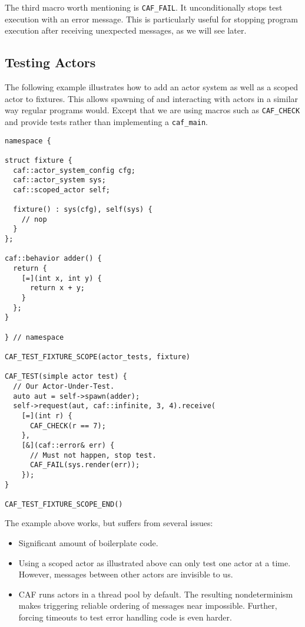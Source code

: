 The third macro worth mentioning is \lstinline^CAF_FAIL^. It unconditionally
stops test execution with an error message. This is particularly useful for
stopping program execution after receiving unexpected messages, as we will see
later.

\subsection{Testing Actors}

The following example illustrates how to add an actor system as well as a
scoped actor to fixtures. This allows spawning of and interacting with actors
in a similar way regular programs would. Except that we are using macros such
as \lstinline^CAF_CHECK^ and provide tests rather than implementing a
\lstinline^caf_main^.

\begin{lstlisting}
namespace {

struct fixture {
  caf::actor_system_config cfg;
  caf::actor_system sys;
  caf::scoped_actor self;

  fixture() : sys(cfg), self(sys) {
    // nop
  }
};

caf::behavior adder() {
  return {
    [=](int x, int y) {
      return x + y;
    }
  };
}

} // namespace

CAF_TEST_FIXTURE_SCOPE(actor_tests, fixture)

CAF_TEST(simple actor test) {
  // Our Actor-Under-Test.
  auto aut = self->spawn(adder);
  self->request(aut, caf::infinite, 3, 4).receive(
    [=](int r) {
      CAF_CHECK(r == 7);
    },
    [&](caf::error& err) {
      // Must not happen, stop test.
      CAF_FAIL(sys.render(err));
    });
}

CAF_TEST_FIXTURE_SCOPE_END()
\end{lstlisting}

The example above works, but suffers from several issues:

\begin{itemize}

  \item

    Significant amount of boilerplate code.

  \item

    Using a scoped actor as illustrated above can only test one actor at a
    time. However, messages between other actors are invisible to us.

  \item

    CAF runs actors in a thread pool by default. The resulting nondeterminism
    makes triggering reliable ordering of messages near impossible. Further,
    forcing timeouts to test error handling code is even harder.

\end{itemize}

